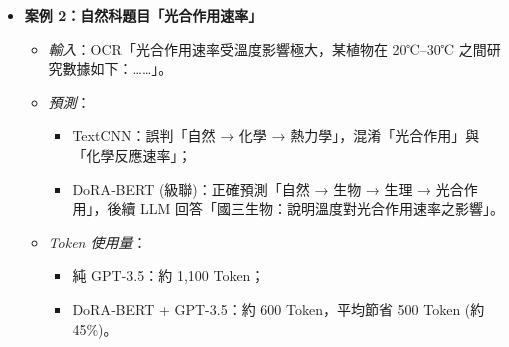 \documentclass[10pt,conference]{IEEEtran}
\begin{document}
\begin{CJK}{UTF8}{bsmi}
\begin{itemize}
  \item \textbf{案例 2：自然科題目「光合作用速率」}  
    \begin{itemize}
      \item \textit{輸入}：OCR「光合作用速率受溫度影響極大，某植物在 20℃–30℃ 之間研究數據如下：……」。  
      \item \textit{預測}：  
        \begin{itemize}
          \item TextCNN：誤判「自然 → 化學 → 熱力學」，混淆「光合作用」與「化學反應速率」；  
          \item DoRA‐BERT (級聯)：正確預測「自然 → 生物 → 生理 → 光合作用」，後續 LLM 回答「國三生物：說明溫度對光合作用速率之影響」。  
        \end{itemize}
      \item \textit{Token 使用量}：  
        \begin{itemize}
          \item 純 GPT-3.5：約 1,100 Token；  
          \item DoRA‐BERT + GPT-3.5：約 600 Token，平均節省 500 Token (約 45\%)。  
        \end{itemize}
    \end{itemize}
\end{itemize}


\end{CJK}
\end{document}
